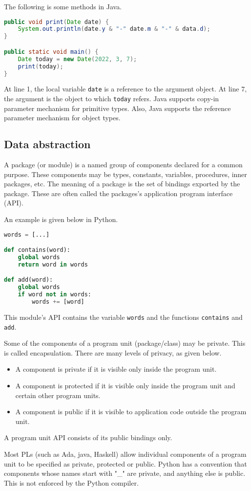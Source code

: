 \documentclass[a4paper, openany]{memoir}
\begin{document}
The following is some methods in Java.
\begin{lstlisting}[language=Java]
public void print(Date date) {
    System.out.println(date.y & "-" date.m & "-" & data.d);
}

public static void main() {
    Date today = new Date(2022, 3, 7);
    print(today);
}
\end{lstlisting}
At line 1, the local variable \texttt{date} is a reference to the argument object. At line 7, the argument is the object to which \texttt{today} refers. Java supports copy-in parameter mechanism for primitive types. Also, Java supports the reference parameter mechanism for object types.

\subsection{Data abstraction}
A package (or module) is a named group of components declared for a common purpose. These components may be types, constants, variables, procedures, inner packages, etc. The meaning of a package is the set of bindings exported by the package. These are often called the packages's application program interface (API).

An example is given below in Python.
\begin{lstlisting}[language=python]
words = [...]

def contains(word):
    global words
    return word in words

def add(word):
    global words
    if word not in words:
        words += [word]
\end{lstlisting}
This module's API contains the variable \texttt{words} and the functions \texttt{contains} and \texttt{add}.

Some of the components of a program unit (package/class) may be private. This is called encapsulation. There are many levels of privacy, as given below.
\begin{itemize}
    \item A component is private if it is visible only inside the program unit.
    \item A component is protected if it is visible only inside the program unit and certain other program units.
    \item A component is public if it is visible to application code outside the program unit.
\end{itemize}
A program unit API consists of its public bindings only.

Most PLs (such as Ada, java, Haskell) allow individual components of a program unit to be specified as private, protected or public. Python has a convention that components whose names start with "\_" are private, and anything else is public. This is not enforced by the Python compiler.
\end{document}
